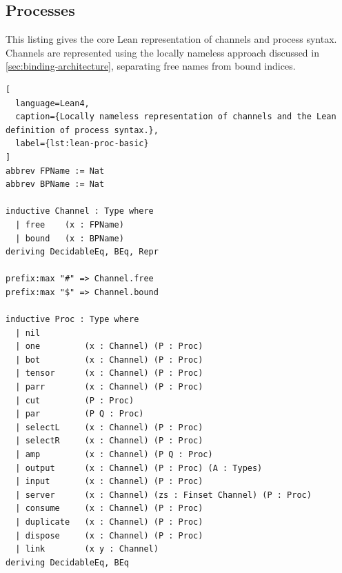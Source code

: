 
\subsection{Processes}\label{app:processes}
This listing gives the core Lean representation of channels and process syntax. Channels are represented using the locally nameless approach discussed in \cref{sec:binding-architecture}, separating free names from bound indices.

\begin{lstlisting}[
  language=Lean4,
  caption={Locally nameless representation of channels and the Lean definition of process syntax.},
  label={lst:lean-proc-basic}
]
abbrev FPName := Nat
abbrev BPName := Nat

inductive Channel : Type where
  | free    (x : FPName)
  | bound   (x : BPName)
deriving DecidableEq, BEq, Repr

prefix:max "#" => Channel.free
prefix:max "$" => Channel.bound

inductive Proc : Type where
  | nil
  | one         (x : Channel) (P : Proc)
  | bot         (x : Channel) (P : Proc)
  | tensor      (x : Channel) (P : Proc)
  | parr        (x : Channel) (P : Proc)
  | cut         (P : Proc)
  | par         (P Q : Proc)
  | selectL     (x : Channel) (P : Proc)
  | selectR     (x : Channel) (P : Proc)
  | amp         (x : Channel) (P Q : Proc)
  | output      (x : Channel) (P : Proc) (A : Types)
  | input       (x : Channel) (P : Proc)
  | server      (x : Channel) (zs : Finset Channel) (P : Proc)
  | consume     (x : Channel) (P : Proc)
  | duplicate   (x : Channel) (P : Proc)
  | dispose     (x : Channel) (P : Proc)
  | link        (x y : Channel)
deriving DecidableEq, BEq
\end{lstlisting}



